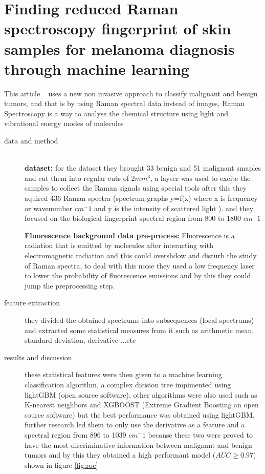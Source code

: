 
\section{Finding reduced Raman spectroscopy fingerprint of skin samples for melanoma diagnosis through machine learning}
    This article ~\cite{Daniella2021} uses a new non invasive approach to classify malignant and benign tumors, and that is by using Raman spectral data instead of images, Raman Spectroscopy is a way to analyse the chemical structure using light and vibrational energy modes of molecules ~\cite{Edinburgh}
\begin{description}
\item[data and method] \hfill \\
    
    \textbf{dataset: }
    for the dataset they brought 33 benign and 51 malignant smaples and cut them into regular cuts of $2mm^3$, a layser was used to excite the samples to collect the Raman signals using special tools after this they aquired 436 Raman spectra (spectrum graphs y=f(x) where x is frequency or wavenumber $cm^-1$ and y is the intensity of scattered light ). and they focused on the biological fingerprint spectral region from 800 to 1800 $cm^-1$

    \textbf{Fluorescence background data pre-process: }
    Fluorescence is a radiation that is emitted by molecules after interacting with electromagnetic radiation and this could overshdow and disturb the study of Raman spectra, to deal with this noise they used a low frequency laser to lower the probability of fluorescence emissions and by this they could jump the preprocessing step.
\item[feature extraction]
    they divided the obtained spectrums into subsequences (local spectrums) and extracted some statistical measures from it such as arithmetic mean, standard deviation, derivative ...etc

\item[results and discussion]
    these statistical features were then given to a machine learning classification algorithm, a complex dicision tree impimented using lightGBM (open source software), other algorithms were also used such as K-nearest neighbors and XGBOOST (Extreme Gradient Boosting an open source software) but the best performance was obtained using lightGBM.
    further research led them to only use the derivative as a feature and a spectral region from 896 to 1039 $cm^-1$ because these two were proved to have the most discriminative information between malignant and benign tumors and by this they obtained a high performant model ($AUC \geq 0.97$) shown in figure \ref{fig:roc}
\end{description}

